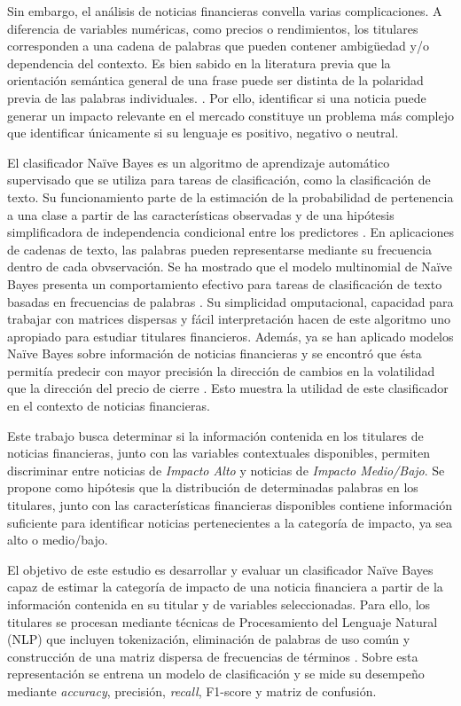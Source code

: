 \documentclass{Academic}
\begin{document}
Sin embargo, el análisis de noticias financieras convella varias complicaciones. 
A diferencia de variables numéricas, como precios o rendimientos, 
los titulares corresponden a una cadena de palabras que pueden contener 
ambigüedad y/o dependencia del contexto. Es bien sabido en la literatura previa 
que la orientación semántica general de una frase puede ser distinta de la 
polaridad previa de las palabras individuales. \cite{malo2014good}. Por ello, 
identificar si una noticia puede generar un impacto relevante en el mercado 
constituye un problema más complejo que identificar únicamente si su lenguaje 
es positivo, negativo o neutral.


El clasificador Naïve Bayes es un algoritmo de aprendizaje automático supervisado que se utiliza para tareas de 
clasificación, como la clasificación de texto. Su funcionamiento parte 
de la estimación de la probabilidad de pertenencia a una clase a partir 
de las características observadas y de una hipótesis simplificadora de 
independencia condicional entre los predictores \cite{kavlakoglu_naivebayes}. %
En aplicaciones de cadenas de texto, las palabras pueden representarse 
mediante su frecuencia dentro de cada obvservación. Se ha mostrado que el modelo 
multinomial de Naïve Bayes presenta un comportamiento efectivo para tareas 
de clasificación de texto basadas en frecuencias de palabras \cite{mccallum1998comparison}. 
Su simplicidad omputacional, capacidad para trabajar con matrices dispersas y fácil 
interpretación hacen de este algoritmo uno apropiado para estudiar titulares financieros. 
Además, ya se han aplicado modelos Naïve Bayes sobre información de noticias 
financieras y se encontró que ésta permitía predecir con mayor precisión 
la dirección de cambios en la volatilidad que la dirección del precio de 
cierre \cite{atkins2018financial}. Esto muestra la utilidad de este clasificador 
en el contexto de noticias financieras.

Este trabajo busca determinar si la información contenida en los 
titulares de noticias financieras, junto con las variables contextuales 
disponibles, permiten discriminar entre noticias de 
\textit{Impacto Alto} y noticias de \textit{Impacto Medio/Bajo}. 
Se propone como hipótesis que la distribución de determinadas 
palabras en los titulares, junto con las características financieras disponibles 
contiene información suficiente para identificar noticias pertenecientes a la categoría de
impacto, ya sea alto o medio/bajo.

El objetivo de este estudio es desarrollar y evaluar un 
clasificador Naïve Bayes capaz de estimar la categoría de impacto de una 
noticia financiera a partir de la información contenida en su titular y de 
variables seleccionadas. Para ello, los titulares se procesan 
mediante técnicas de Procesamiento del Lenguaje Natural (NLP) que incluyen 
tokenización, eliminación de palabras de uso común y construcción de una matriz 
dispersa de frecuencias de términos \cite{CN_2022}. Sobre esta representación se entrena un modelo 
de clasificación y se mide su desempeño mediante \textit{accuracy}, precisión, \textit{recall}, 
F1-score y matriz de confusión.
\end{document}
